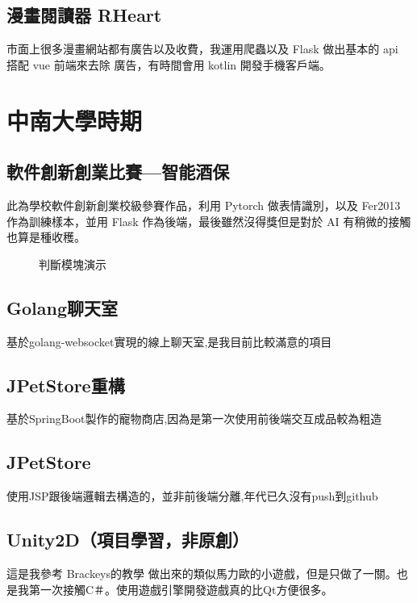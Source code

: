 \documentclass[classical]{einfart}
\begin{document}
\subsection{漫畫閱讀器 RHeart}

市面上很多漫畫網站都有廣告以及收費，我運用爬蟲以及 Flask 做出基本的 api 搭配 vue 前端來去除
廣告，有時間會用 kotlin 開發手機客戶端。

\section{中南大學時期}

\subsection{軟件創新創業比賽—智能酒保}
此為學校軟件創新創業校級參賽作品，利用 Pytorch 做表情識別，以及 Fer2013 作為訓練樣本，並用
Flask 作為後端，最後雖然沒得獎但是對於 AI 有稍微的接觸也算是種收穫。

\begin{figure}[H]
    \centering  %
    \caption{判斷模塊演示}
    \label{Fig.main}
\end{figure}

\subsection{Golang聊天室}

基於golang-websocket實現的線上聊天室,是我目前比較滿意的項目
\subsection{JPetStore重構}

基於SpringBoot製作的寵物商店,因為是第一次使用前後端交互成品較為粗造
\subsection{JPetStore}

使用JSP跟後端邏輯去構造的，並非前後端分離,年代已久沒有push到github
\subsection{Unity2D（項目學習，非原創）}

這是我參考 Brackeys的教學 做出來的類似馬力歐的小遊戲，但是只做了一關。也是我第一次接觸C＃。使用遊戲引擎開發遊戲真的比Qt方便很多。
\end{document}

